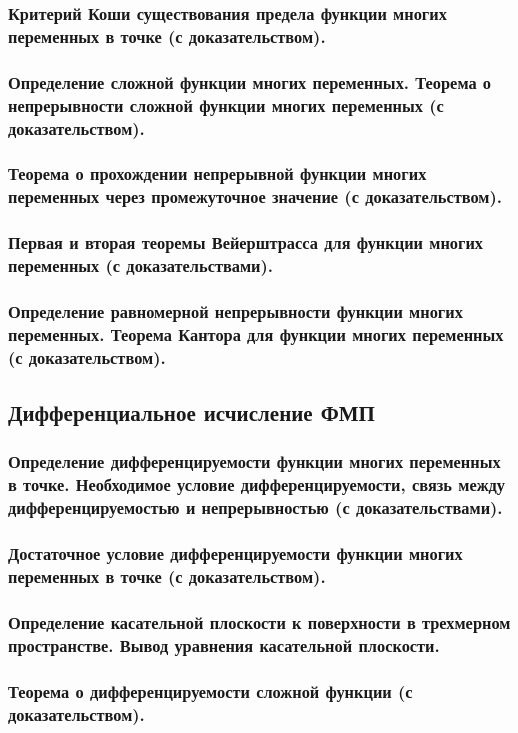 \documentclass[10pt]{article}
\begin{document}
    \subsubsection{Критерий Коши существования предела функции многих переменных в точке (с доказательством).}
    \subsubsection{Определение сложной функции многих переменных. Теорема о непрерывности сложной функции многих переменных (с доказательством).}
    \subsubsection{Теорема о прохождении непрерывной функции многих переменных через промежуточное значение (с доказательством).}
    \subsubsection{Первая и вторая теоремы Вейерштрасса для функции многих переменных (с доказательствами).}
    \subsubsection{Определение равномерной непрерывности функции многих переменных. Теорема Кантора для функции многих переменных (с доказательством).}
    \subsection{Дифференциальное исчисление ФМП}
    \subsubsection{Определение дифференцируемости функции многих переменных в точке. Необходимое условие дифференцируемости, связь между дифференцируемостью и непрерывностью (с доказательствами).}
    \subsubsection{Достаточное условие дифференцируемости функции многих переменных в точке (с доказательством).}
    \subsubsection{Определение касательной плоскости к поверхности в трехмерном пространстве. Вывод уравнения касательной плоскости.}
    \subsubsection{Теорема о дифференцируемости сложной функции (с доказательством).}
\end{document}
